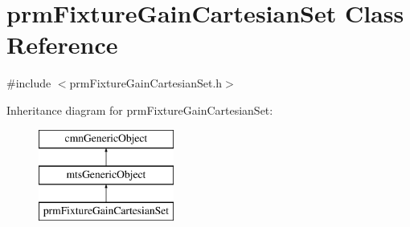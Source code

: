 \hypertarget{classprm_fixture_gain_cartesian_set}{\section{prm\-Fixture\-Gain\-Cartesian\-Set Class Reference}
\label{classprm_fixture_gain_cartesian_set}
}


{\ttfamily \#include $<$prm\-Fixture\-Gain\-Cartesian\-Set.\-h$>$}

Inheritance diagram for prm\-Fixture\-Gain\-Cartesian\-Set\-:\begin{figure}[H]
\begin{center}
\leavevmode
\includegraphics[height=3.000000cm]{d7/de4/classprm_fixture_gain_cartesian_set}
\end{center}
\end{figure}
